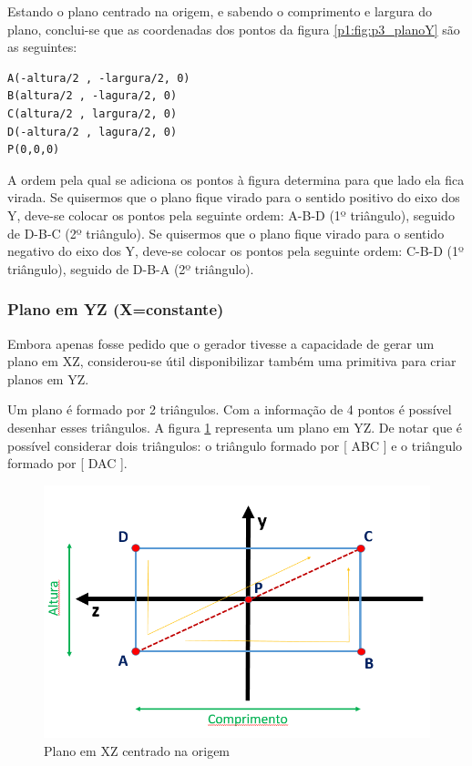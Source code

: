 Estando o plano centrado na origem, e sabendo o comprimento e largura do plano, conclui-se que as coordenadas dos pontos da figura \ref{p1:fig:p3_planoY} são as seguintes:

\begin{Verbatim}
A(-altura/2 , -largura/2, 0)
B(altura/2 , -lagura/2, 0)
C(altura/2 , largura/2, 0)
D(-altura/2 , lagura/2, 0)
P(0,0,0)
\end{Verbatim}



A ordem pela qual se adiciona os pontos à figura determina para que lado ela fica virada. Se quisermos que o plano fique virado para o sentido positivo do eixo dos Y, deve-se colocar os pontos pela seguinte ordem: A-B-D (1º triângulo), seguido de D-B-C (2º triângulo). Se quisermos que o plano fique virado para o sentido negativo do eixo dos Y, deve-se colocar os pontos pela seguinte ordem: C-B-D (1º triângulo), seguido de D-B-A (2º triângulo).



\subsubsection{Plano em YZ (X=constante)}

Embora apenas fosse pedido que o gerador tivesse a capacidade de gerar um plano em XZ, considerou-se útil disponibilizar também uma primitiva para criar planos em YZ.

\newpage
Um plano é formado por 2 triângulos. Com a informação de 4 pontos é possível desenhar esses triângulos. A figura \ref{p1:fig:p3_planoZ} representa um plano em YZ. De notar que é possível considerar dois triângulos: o triângulo formado por [ ABC ] e o triângulo formado por [ DAC ].

\begin{figure}[<+htpb+>]
	\centering
	\includegraphics[scale=0.5]{imagens/p3_planoZ.png}
	\caption{Plano em XZ centrado na origem}
	\label{p1:fig:p3_planoZ}
\end{figure}

